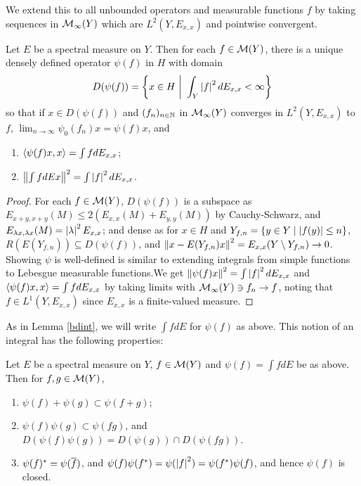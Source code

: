 \documentclass[10pt]{amsart}
\begin{document}
We extend this to all unbounded operators and measurable functions $f$ by taking sequences in $\mathcal{M}_\infty(Y)$ which are $L^2(Y, E_{x, x})$ and pointwise convergent.
\begin{proposition}\label{unbdint}
    Let $E$ be a spectral measure on $Y$. Then for each $f \in \mathcal{M}(Y)$, there is a unique densely defined operator $\psi(f)$ in $H$ with domain
    $$
        D(\psi(f)) = \set{x \in H \ \bigg| \ \int_Y \abs{f}^2 dE_{x, x} < \infty}
    $$
    so that if $x \in D(\psi(f))$ and $(f_n)_{n \in \mathbb{N}}$ in $\mathcal{M}_\infty(Y)$ converges in $L^2(Y, E_{x, x})$ to $f$, $\lim_{n \to \infty}\psi_0(f_n)x = \psi(f)x$, and
    \begin{enumerate}
        \item $\left\langle \psi(f)x, x \right\rangle = \int f dE_{x, x}$;
        \item $\left\| \int f dE x \right\|^2 = \int \left| f \right|^2 dE_{x, x}$.
    \end{enumerate}
\end{proposition}
\begin{proof}
    For each $f \in \mathcal{M}(Y)$, $D(\psi(f))$ is a subspace as $E_{x + y, x + y}(M) \leq 2(E_{x, x}(M) + E_{y, y}(M))$ by Cauchy-Schwarz, and $E_{\lambda x, \lambda x}(M) = \left| \lambda \right|^2E_{x, x}$; and dense as for $x \in H$ and $Y_{f, n} = \left\{  y \in Y \mid \left| f(y) \right| \leq n  \right\}$, $R(E(Y_{f, n})) \subseteq D(\psi(f))$, and $\left\| x - E(Y_{f, n})x \right\|^2 = E_{x, x}(Y \setminus Y_{f, n}) \to 0$. Showing $\psi$ is well-defined is similar to extending integrals from simple functions to Lebesgue measurable functions.We get $\left\| \psi(f)x \right\|^2 = \int \left| f \right|^2dE_{x, x}$ and $\left\langle \psi(f)x, x \right\rangle = \int f dE_{x, x}$ by taking limits with $\mathcal{M}_\infty(Y) \ni f_n \to f$, noting that $f \in L^1(Y, E_{x, x})$ since $E_{x, x}$ is a finite-valued measure.
\end{proof}
As in Lemma \ref{bdint}, we will write $\int f dE$ for $\psi(f)$ as above. This notion of an integral has the following properties:
\begin{proposition}\label{psiprops}
    Let $E$ be a spectral measure on $Y$, $f \in \mathcal{M}(Y)$ and $\psi(f) = \int f dE$ be as above. Then for $f, g \in \mathcal{M}(Y)$,
    \begin{enumerate}
        \item $\psi(f) + \psi(g) \subset \psi(f + g)$;
        \item $\psi(f)\psi(g) \subset \psi(fg)$, and $D(\psi(f)\psi(g)) = D(\psi(g)) \cap D(\psi(fg))$.
        \item $\psi(f)^* = \psi(\overline{f})$, and $\psi(f)\psi(f^*) = \psi(\left| f \right|^2) = \psi(f^*)\psi(f)$, and hence $\psi(f)$ is closed.
    \end{enumerate}
\end{proposition}
\end{document}
